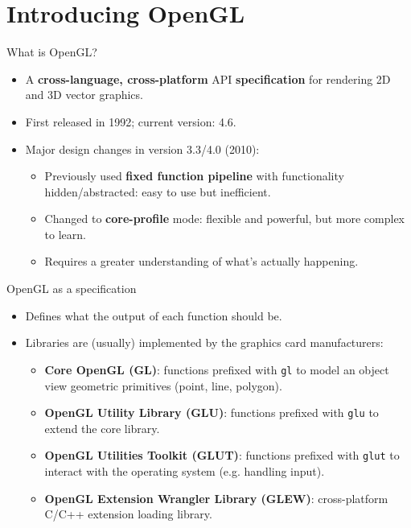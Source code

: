 \part{Introducing OpenGL}
\frame{\partpage}

\begin{frame}{What is OpenGL?}
	\begin{itemize}
		\pause\item A \textbf{cross-language, cross-platform} API \textbf{specification} for rendering 2D and 3D vector graphics.
		\pause\item First released in 1992; current version: 4.6.
		\pause\item Major design changes in version 3.3/4.0 (2010):
		\begin{itemize}
			\pause\item Previously used \textbf{fixed function pipeline} with functionality hidden/abstracted: easy to use but inefficient.
			\pause\item Changed to \textbf{core-profile} mode: flexible and powerful, but more complex to learn.
			\pause\item Requires a greater understanding of what's actually happening.
		\end{itemize}
	\end{itemize}
\end{frame}

\begin{frame}{OpenGL as a specification}
	\begin{itemize}
		\pause\item Defines what the output of each function should be.
		\pause\item Libraries are (usually) implemented by the graphics card manufacturers:
		\begin{itemize}
			\pause\item \textbf{Core OpenGL (GL)}: functions prefixed with \lstinline{gl} to model an object view geometric primitives (point, line, polygon).
			\pause\item \textbf{OpenGL Utility Library (GLU)}:  functions prefixed with \lstinline{glu} to extend the core library.
			\pause\item \textbf{OpenGL Utilities Toolkit (GLUT)}: functions prefixed with \lstinline{glut} to interact with the operating system (e.g. handling input).
			\pause\item \textbf{OpenGL Extension Wrangler Library (GLEW)}: cross-platform C/C++ extension loading library.
		\end{itemize}
	\end{itemize}
\end{frame}

